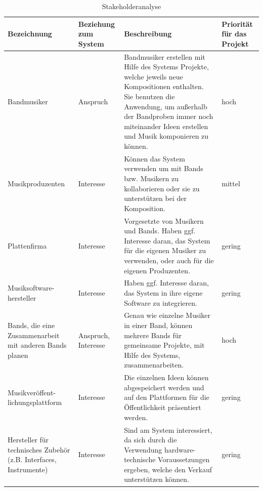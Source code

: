 \documentclass[12pt]{scrartcl}
\begin{document}
\begin{table}[!ht]

\begin{tabular}{|p{3cm}|p{3.0cm}|p{7cm}|p{2cm}|} \hline

\textbf{Bezeichnung} & \textbf{Beziehung zum System} & \textbf{Beschreibung} & \textbf{Priorität für das Projekt}\\ \hline

Bandmusiker & Anspruch & Bandmusiker erstellen mit Hilfe des Systems Projekte, welche jeweils neue Kompositionen enthalten. Sie benutzen die Anwendung, um außerhalb der Bandproben immer noch miteinander Ideen erstellen und Musik komponieren zu können. & hoch \\ \hline

Musikproduzenten & Interesse & Können das System verwenden um mit Bands bzw. Musikern zu kollaborieren oder sie zu unterstützen bei der Komposition. & mittel \\ \hline

Plattenfirma & Interesse & Vorgesetzte von Musikern und Bands. Haben ggf. Interesse daran, das System für die eigenen Musiker zu verwenden, oder auch für die eigenen Produzenten. & gering \\ \hline

Musiksoftware- hersteller & Interesse & Haben ggf. Interesse daran, das System in ihre eigene Software zu integrieren. & gering \\ \hline

Bands, die eine Zusammenarbeit mit anderen Bands planen & Anspruch, Interesse & Genau wie einzelne Musiker in einer Band, können mehrere Bands für gemeinsame Projekte, mit Hilfe des Systems, zusammenarbeiten. & hoch \\ \hline

Musikveröffent- lichungsplattform & Interesse & Die einzelnen Ideen können abgespeichert werden und auf den Plattformen für die Öffentlichkeit präsentiert werden. & gering \\ \hline

Hersteller für technisches Zubehör (z.B. Interfaces, Instrumente) & Interesse & Sind am System interessiert, da sich durch die Verwendung hardware-technische Voraussetzungen ergeben, welche den Verkauf unterstützen können. & gering \\ \hline



\end{tabular}
\caption{Stakeholderanalyse}
\end{table}
\end{document}
